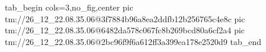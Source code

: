  
 
 
 
 

\qqSecOrig


\ifcmt
  tab_begin cols=3,no_fig,center
    pic tm://26_12_22.08.35.06@3f7884b96a8ea2ddfb12b256765c4e8c
    pic tm://26_12_22.08.35.06@6482da578c067fc8b269bcd80a6cf2a4
    pic tm://26_12_22.08.35.06@2bc96f9f6a612ff3a399ea178e2520d9
  tab_end
\fi

